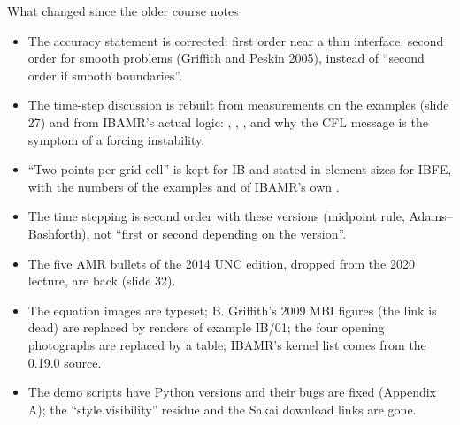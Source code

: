 \documentclass[aspectratio=169,11pt]{beamer}
\begin{document}
\begin{frame}{What changed since the older course notes}
\small
\begin{itemize}
  \item The accuracy statement is corrected: first order near a thin interface, second order for smooth problems (Griffith and Peskin 2005), instead of ``second order if smooth boundaries''.
  \item The time-step discussion is rebuilt from measurements on the examples (slide 27) and from IBAMR's actual logic: , , , and why the CFL message is the symptom of a forcing instability.
  \item ``Two points per grid cell'' is kept for IB and stated in element sizes for IBFE, with the numbers of the examples and of IBAMR's own .
  \item The time stepping is second order with these versions (midpoint rule, Adams--Bashforth), not ``first or second depending on the version''.
  \item The five AMR bullets of the 2014 UNC edition, dropped from the 2020 lecture, are back (slide 32).
  \item The equation images are typeset; B. Griffith's 2009 MBI figures (the link is dead) are replaced by renders of example IB/01; the four opening photographs are replaced by a table; IBAMR's kernel list comes from the 0.19.0 source.
  \item The demo scripts have Python versions and their bugs are fixed (Appendix A); the ``style.visibility'' residue and the Sakai download links are gone.
\end{itemize}
\end{frame}
\end{document}
